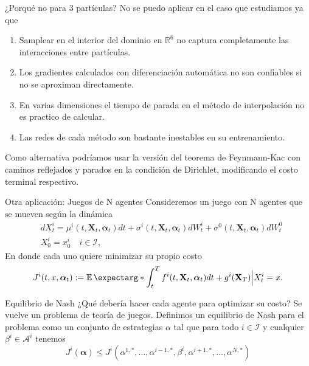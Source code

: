 \documentclass[aspectratio=169,xcolor=dvipsnames]{beamer}
\newcommand{\bbR}{\mathbb{R}}
\newcommand{\bfX}{\mathbf{X}}
\newcommand{\bfAlp}{\bm{\alpha}}
\begin{document}
\begin{frame}{¿Porqué no para 3 partículas?}
	No se puedo aplicar en el caso que estudiamos ya que
	\begin{enumerate}
		\item Samplear en el interior del dominio en $\bbR^6$ no captura completamente las interacciones entre partículas.
		\item Los gradientes calculados con diferenciación automática no son confiables si no se aproximan directamente.
		\item En varias dimensiones el tiempo de parada en el método de interpolación no es practico de calcular.
		\item Las redes de cada método son bastante inestables en su entrenamiento.
	\end{enumerate}
Como alternativa podríamos usar la versión del teorema de Feynmann-Kac con caminos reflejados y parados en la condición de Dirichlet, modificando el costo terminal respectivo.
\end{frame}

\begin{frame}{Otra aplicación: Juegos de N agentes}
	Consideremos un juego con N agentes que se mueven según la dinámica \parencite{han_deep_2020}
	\begin{equation}
	\begin{split}
		&dX_t^{i}=\mu^{i}(t,\bfX_t,\bfAlp_t)dt+\sigma^{i}(t,\bfX_t,\bfAlp_t)dW_t^{i}+\sigma^{0}(t,\bfX_t,\bfAlp_t)dW_{t}^0\\
		&X_{0}^{i}=x_{0}^{i} \quad  i\in \mathcal{I},
	\end{split}
\end{equation}
En donde cada uno quiere minimizar su propio costo
\begin{equation}
	\label{eqn:individualCost}
	J^i(t,x,\bfAlp_t):=\expect*{\int_{t}^{T}f^i(t,\bfX_t,\bfAlp_t)dt +g^i(\bfX_T)\Big| X_t^i=x}.
\end{equation}
\end{frame}


\begin{frame}{Equilibrio de Nash}
	¿Qué debería hacer cada agente para optimizar su costo? Se vuelve un problema de teoría de juegos. Definimos un equilibrio de Nash para el problema como un conjunto de estrategias $\alpha$ tal que para todo $i\in\mathcal{I}$ y cualquier $\beta^i\in\mathcal{A}^i$ tenemos
	$$J^{i}(\bfAlp)\leq J^i(\alpha^{1,*},\ldots,\alpha^{i-1,*},\beta^i,\alpha^{i+1,*},\ldots ,\alpha^{N,*})$$
\end{frame}
\end{document}
